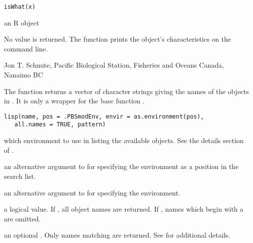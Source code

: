 \documentclass[letterpaper]{book}
\begin{document}
%
\begin{Usage}
\begin{verbatim}
isWhat(x)
\end{verbatim}
\end{Usage}
%
\begin{Arguments}
\begin{ldescription}
\item[\code{x}] an R object
\end{ldescription}
\end{Arguments}
%
\begin{Value}
No value is returned. The function prints the object's 
characteristics on the command line.
\end{Value}
%
\begin{Author}\relax
Jon T. Schnute, Pacific Biological Station, Fisheries and Oceans Canada, Nanaimo BC
\end{Author}
%
\begin{Description}\relax
The function  returns a vector of character strings
giving the names of the objects in . It is only
a wrapper for the base function .
\end{Description}
%
\begin{Usage}
\begin{verbatim}
lisp(name, pos = .PBSmodEnv, envir = as.environment(pos),
   all.names = TRUE, pattern)
\end{verbatim}
\end{Usage}
%
\begin{Arguments}
\begin{ldescription}
\item[\code{name}] which environment to use in listing the available objects.
See the details section of .
\item[\code{pos}] an alternative argument to  for specifying the
environment as a position in the search list.
\item[\code{envir}] an alternative argument to  for specifying the
environment.
\item[\code{all.names}] a logical value.  If , all
object names are returned.  If , names which begin with a
 are omitted.
\item[\code{pattern}] an optional .  Only names
matching  are returned. See 
for additional details.
\end{ldescription}
\end{Arguments}
\end{document}
